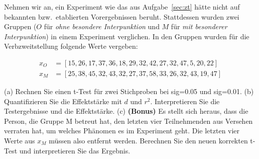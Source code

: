 Nehmen wir an, ein Experiment wie das aus Aufgabe~\ref{sec:zt} hätte nicht auf bekannten bzw.\ etablierten Vorergebnissen beruht.
Stattdessen wurden zwei Gruppen ($O$ für \textit{ohne besondere Interpunktion} und $M$ für \textit{mit besonderer Interpunktion}) in einem Experiment verglichen.
In den Gruppen wurden für die Verbzweitstellung folgende Werte vergeben:

\begin{center}
  \begin{align}
    x_{O} &= [15, 26, 17, 37, 36, 18, 29, 32, 42, 27, 32, 47,  5, 20, 22]\\
    x_{M} &= [25, 38, 45, 32, 43, 32, 27, 37, 58, 33, 26, 32, 43, 19, 47]
  \end{align}
\end{center}

(a) Rechnen Sie einen t-Test für zwei Stichproben bei sig=0.05 und sig=0.01.
(b) Quantifizieren Sie die Effektstärke mit $d$ und $r^2$.
Interpretieren Sie die Testergebnisse und die Effektstärke.
(c) \textbf{(Bonus)} Es stellt sich heraus, dass die Person, die Gruppe M betreut hat, den letzten vier Teilnehmenden aus Versehen verraten hat, um welches Phänomen es im Experiment geht.
Die letzten vier Werte aus $x_M$ müssen also entfernt werden.
Berechnen Sie den neuen korrekten t-Test und interpretieren Sie das Ergebnis.\\




